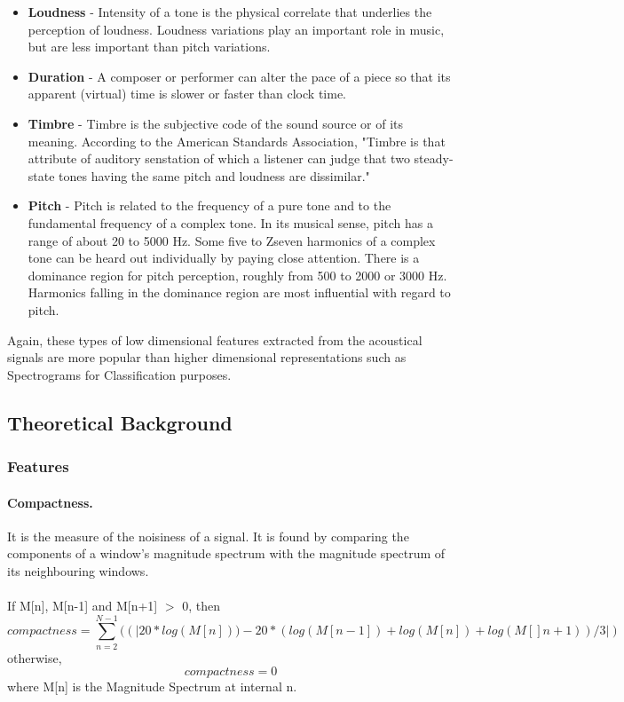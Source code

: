 \begin{itemize}
        \item \textbf{Loudness} - Intensity of a tone is the physical correlate that underlies the perception of loudness. Loudness variations play an important role in music, but are less important than pitch variations.

        \item \textbf{Duration} - A composer or performer can alter the pace of a piece so that its apparent (virtual) time is slower or faster than clock time. 

        \item \textbf{Timbre} - Timbre is the subjective code of the sound source or of its meaning. According to the American Standards Association, "Timbre
                is that attribute of auditory senstation of which a listener can judge that two steady-state tones having the same pitch and loudness are dissimilar."

        \item \textbf{Pitch} - Pitch is related to the frequency of a pure tone and to the fundamental frequency of a complex tone. In its musical sense, pitch
                has a range of about 20 to 5000 Hz. Some five to Zseven harmonics of a complex tone can be heard out individually by paying close attention. There
                is a dominance region for pitch perception, roughly from 500 to 2000 or 3000 Hz. Harmonics falling in the dominance region are most influential 
                with regard to pitch.

\end{itemize}

Again, these types of low dimensional features extracted from the acoustical signals are more popular than higher dimensional representations such as
Spectrograms for Classification purposes. \cite{prasad2007}

\subsection{Theoretical Background}
\subsubsection{Features}
\paragraph{Compactness.}
It is the measure of the noisiness of a signal. It is found by comparing the 
components of a window’s magnitude spectrum with the magnitude spectrum of its  
neighbouring windows.\\ 
\\
If M[n], M[n-1] and M[n+1] $>$ 0, then
\begin{equation}
        compactness = \sum_{n=2}^{N-1}{((|20*log(M[n]))-20*(log(M[n-1])+log(M[n])+log(M[]n+1))/3|)}
\end{equation}
otherwise,
\begin{equation}
        compactness = 0
\end{equation}
where M[n] is the Magnitude Spectrum at internal n.

